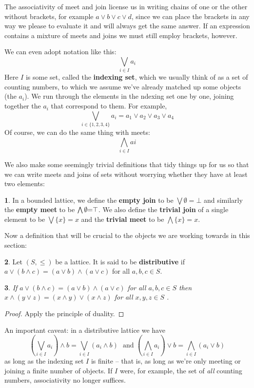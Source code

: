 \documentclass[oneside,english]{amsbook}
\numberwithin{section}{chapter}
\theoremstyle{plain}
\newtheorem{thm}{\protect\theoremname}
\theoremstyle{definition}
\newtheorem{defn}[thm]{\protect\definitionname}
\providecommand{\definitionname}{Definition}
\providecommand{\theoremname}{Theorem}
\begin{document}
The associativity of meet and join license us in writing chains of one or the other without brackets, for example $a\lor b\lor c\lor d$, since we can place the brackets in any way we please to evaluate it and will always get the same answer. If an expression contains a mixture of meets and joins we must still employ brackets, however.

We can even adopt notation like this: 
	\[ \bigvee_{i\in I}a_{i} \]
Here $I$ is some set, called the \textbf{indexing set}, which we usually think of as a set of counting numbers, to which we assume we've already matched up some objects (the $a_{i}$). We run through the elements in the ndexing set one by one, joining together the $a_{i}$ that correspond to them. For example, 
	\[ \bigvee_{i\in\{1,2,3,4\}}a_{i}=a_{1}\lor a_{2}\lor a_{3}\lor a_{4} \]
 Of course, we can do the same thing with meets: 
 	\[ \bigwedge_{i\in I}ai \]

We also make some seemingly trivial definitions that tidy things up for us so that we can write meets and joins of sets without worrying whether they have at least two elements: 

\begin{defn} 
	In a bounded lattice, we define the \textbf{empty join }to be $\bigvee\emptyset=\bot$ and similarly the \textbf{empty meet }to be $\text{\ensuremath{\bigwedge\emptyset}=\ensuremath{\top}}$. We also define the \textbf{trivial join }of a single element to be $\bigvee\{x\}=x$ and the \textbf{trivial meet }to be $\bigwedge\{x\}=x$. 
\end{defn} 

Now a definition that will be crucial to the objects we are working towards in this section: 

\begin{defn} 
	Let $(S,\le)$ be a lattice. It is said to be \textbf{distributive} if $a\lor(b\land c)=(a\lor b)\land(a\lor c)$ for all $a,b,c\in S$.
\end{defn} 

\begin{thm} 
	If $a\lor(b\land c)=(a\lor b)\land(a\lor c)$ for all $a,b,c\in S$ then $x\land(y\lor z)=(x\land y)\lor(x\land z)$ for all $x,y,z\in S$ .
\end{thm} 
\begin{proof} 
	Apply the principle of duality. 
\end{proof} 

An important caveat: in a distributive lattice we have 
	\[ 
		(\bigvee_{i\in I}a_{i})\land b=\bigvee_{i\in I}(a_{i}\land b)\ \ \ \text{and\ \ \  }(\bigwedge_{i\in I}a_{i})\lor b=\bigwedge_{i\in I}(a_{i}\lor b) 
	\]
as long as the indexing set $I$ is finite -- that is, as long as we're only meeting or joining a finite number of objects. If $I$ were, for example, the set of \emph{all }counting numbers, associativity no longer suffices. 
\end{document}

